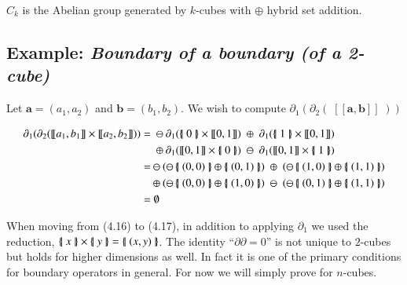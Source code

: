 \begin{definition}
	$C_k$ is the Abelian group generated by $k$-cubes with $\oplus$ hybrid set addition.
\end{definition}


\subsection{Example: \emph{Boundary of a boundary (of a 2-cube)}}
Let $\boldsymbol{a} =(a_1,a_2)$ and $\boldsymbol{b}= (b_1,b_2)$.
We wish to compute $\partial_1 ( \partial_2 ( \; [\![\boldsymbol{a}, \boldsymbol{b} ]\!] \; ) )$

\begin{align}
	\partial_1 ( \partial_2 ( [\![ a_1 , b_1 ]\!] \times [\![a_2, b_2 ]\!] ) )
	=	& \; \ominus \partial_1( \hset{0} \times [\![0,1]\!]) \; \oplus 	\; \partial_1(\hset{1} \times [\![0,1]\!]) \notag \\
		& \; \oplus 	\partial_1( [\![0,1]\!] \times \hset{0}) \; \ominus \; \partial_1([\![0,1]\!] \times \hset{1}) \\
	=	& \ominus	( \ominus \hset{(0,0)} \oplus \hset{(0,1)} ) \; \oplus \; 	(\ominus \hset{(1,0)} \oplus \hset{(1,1)}) \notag \\
		& \oplus 	( \ominus \hset{(0,0)} \oplus \hset{(1,0)} ) \; \ominus \;	(\ominus \hset{(0,1)} \oplus \hset{(1,1)}) \\
	=	& \;\emptyset	
\end{align}

When moving from (4.16) to (4.17), in addition to applying $\partial_1$ we used the reduction, $\left\{ \! \left| \; x \; \right| \! \right\} \times \left\{ \! \left| \; y \; \right| \! \right\} = \left\{ \! \left| \;  (x,y)  \; \right| \! \right\}$.
The identity ``$\partial \partial = 0$'' is not unique to $2$-cubes but holds for higher dimensions as well.
In fact it is one of the primary conditions for boundary operators in general.
For now we will simply prove for $n$-cubes.


